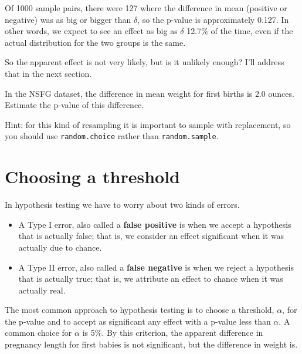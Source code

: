 \documentclass[12pt]{book}
\begin{document}
Of 1000 sample pairs, there were 127 where the difference in mean
(positive or negative) was as big or bigger than $\delta$, so the
p-value is approximately 0.127.  In other words, we expect to see an
effect as big as $\delta$ 12.7\% of the time, even if the actual
distribution for the two groups is the same.

So the apparent effect is not very likely, but is it unlikely enough?
I'll address that in the next section.

\begin{ex}

In the NSFG dataset, the difference in mean weight for first
births is 2.0 ounces.  Estimate the p-value of this difference.

Hint: for this kind of resampling it is important to sample
with replacement, so you should use {\tt random.choice} rather
than {\tt random.sample}.



\end{ex}


\section{Choosing a threshold}
\label{threshold}

In hypothesis testing we have to worry about two kinds of errors.

\begin{itemize}

\item A Type I error, also called a {\bf false positive} is when we
  accept a hypothesis that is actually false; that is, we consider an
  effect significant when it was actually due to chance.

\item A Type II error, also called a {\bf false negative} is when we
  reject a hypothesis that is actually true; that is, we attribute an
  effect to chance when it was actually real.

\end{itemize}

The most common approach to hypothesis testing is to choose a
threshold, $\alpha$, for the p-value and to accept as significant any
effect with a p-value less than $\alpha$.  A common choice for
$\alpha$ is 5\%.  By this criterion, the apparent difference in
pregnancy length for first babies is not significant, but the
difference in weight is.
\end{document}
